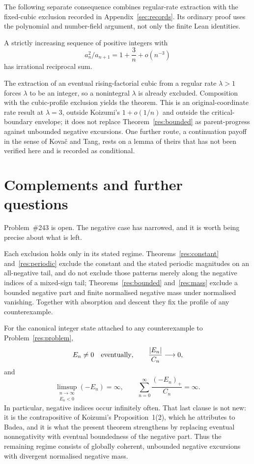 \documentclass[11pt]{article}
\begin{document}
The following separate consequence combines regular-rate extraction with the
fixed-cubic exclusion recorded in Appendix~\ref{sec:records}.  Its ordinary
proof uses the polynomial and number-field argument, not only the finite
Lean identities.

\begin{theorem}\label{res:cubicrate}
A strictly increasing sequence of positive integers with
\[
 a_n^2/a_{n+1}=1+\frac{3}{n}+o(n^{-3})
\]
has irrational reciprocal sum.
\end{theorem}

The extraction of an eventual rising-factorial cubic from a regular rate
$\lambda>1$ forces $\lambda$ to be an integer, so a nonintegral $\lambda$ is
already excluded.  Composition with the cubic-profile exclusion yields the
theorem.  This is an original-coordinate rate result at $\lambda=3$, outside
Koizumi's $1+o(1/n)$ and outside the critical-boundary envelope; it does not
replace Theorem~\ref{res:bounded} as parent-progress against unbounded
negative excursions.  One further
route, a continuation payoff in the sense of Kova\v c and Tang, rests on a lemma
of theirs that has not been verified here and is recorded as conditional.

\section{Complements and further questions}\label{sec:open}

Problem~\#243 is open.  The negative case has narrowed, and it is worth being
precise about what is left.

Each exclusion holds only in its stated regime.  Theorems~\ref{res:constant}
and~\ref{res:periodic} exclude the constant and the stated periodic magnitudes
on an all-negative tail, and do not exclude those patterns merely along the
negative indices of a mixed-sign tail; Theorems~\ref{res:bounded}
and~\ref{res:mass} exclude a bounded negative part and finite normalised
negative mass under normalised vanishing.  Together with absorption and descent
they fix the profile of any counterexample.

\begin{proposition}\label{res:frontier}
For the canonical integer state attached to any counterexample to
Problem~\ref{res:problem},
\[
 E_n\ne0\quad\hbox{eventually},\qquad
 \frac{|E_n|}{C_n}\longrightarrow0,
\]
and
\[
 \limsup_{\substack{n\to\infty\\E_n<0}}(-E_n)=\infty,
 \qquad
 \sum_{n=0}^{\infty}\frac{(-E_n)_+}{C_n}=\infty .
\]
In particular, negative indices occur infinitely often.  That last clause is
not new: it is the contrapositive of Koizumi's Proposition~1(2), which he
attributes to Badea, and it is what the present theorem strengthens by
replacing eventual nonnegativity with eventual boundedness of the negative
part.  Thus the remaining
regime consists of globally coherent, unbounded negative excursions with
divergent normalised negative mass.
\end{proposition}
\end{document}

